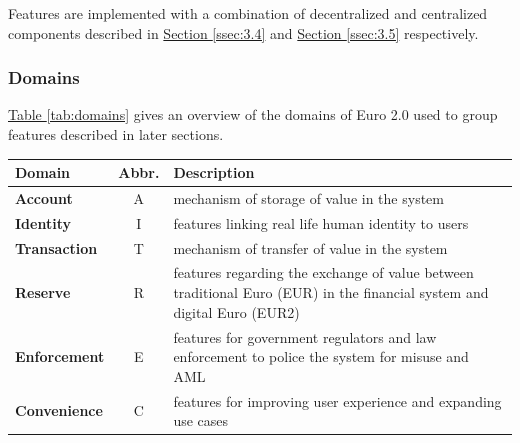 \documentclass[a4paper,12pt]{article} %
\newcommand{\hypertableref}[1]{\hyperref[#1]{Table \ref{#1}}}
\newcommand{\hypersectionref}[1]{\hyperref[#1]{Section \ref{#1}}}
\begin{document}
{{Features are implemented with a combination of decentralized and centralized components described in \hypersectionref{ssec:3.4} and \hypersectionref{ssec:3.5} respectively.

\subsubsection{Domains} \label{sssec:3.3:domains}

\hypertableref{tab:domains} gives an overview of the domains of Euro 2.0 used to group features described in later sections.

\begin{center}
\begin{tabular}{ | l | c | p{10cm} | }
 \hline
 Domain & Abbr. & Description \\
 \hline
 \textbf{Account} & A & mechanism of storage of value in the system
 \\ \hline
 \textbf{Identity} & I & features linking real life human identity to users
 \\ \hline
 \textbf{Transaction} & T & mechanism of transfer of value in the system
 \\ \hline
 \textbf{Reserve} & R & features regarding the exchange of value between traditional Euro (EUR) in the financial system and digital Euro (EUR2)
 \\ \hline
 \textbf{Enforcement} & E & features for government regulators and law enforcement to police the system for misuse and AML
 \\ \hline
 \textbf{Convenience} & C & features for improving user experience and expanding use cases
 \\ \hline
\end{tabular}
\end{center}
\label{tab:domains}

%

}}
\end{document}
